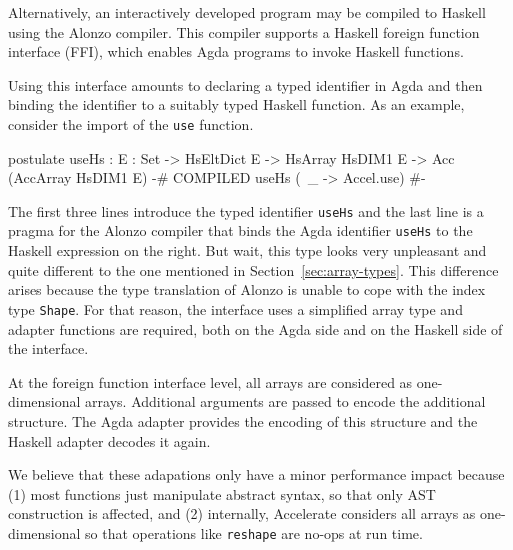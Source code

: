 \documentclass{llncs}
\begin{document}
Alternatively, an interactively developed program may be compiled to
Haskell using the Alonzo compiler. This compiler supports a Haskell
foreign function interface (FFI), which enables Agda programs to invoke
Haskell functions. 

Using this interface amounts to declaring a typed identifier in Agda
and then binding the identifier to a suitably typed Haskell
function. As an example, consider the import of the \texttt{use}
function.
\begin{code}
postulate 
  useHs : {E : Set}
      -> HsEltDict E -> HsArray HsDIM1 E -> Acc (AccArray HsDIM1 E)
  {-# COMPILED useHs       (\ _ -> Accel.use) #-}
\end{code}
The first three lines introduce the typed identifier \texttt{useHs}
and the last line is a pragma for the Alonzo compiler that binds the
Agda identifier \texttt{useHs} to the Haskell expression on the right.
But wait, this type looks very unpleasant and quite different to the
one mentioned in Section~\ref{sec:array-types}. This difference arises
because the type translation of Alonzo is unable to cope with the
index type \texttt{Shape}. For that reason, the interface uses a
simplified array type and adapter functions are required, both on the
Agda side and on the Haskell side of the interface.

At the foreign function interface level, all arrays are considered as
one-dimensional arrays. Additional arguments are passed to encode the
additional structure. The Agda adapter provides the encoding of this
structure and the Haskell adapter decodes it again. 

We believe that these adapations only have a minor performance impact
because (1) most functions just manipulate abstract syntax, so that
only AST construction is affected, and (2) internally, Accelerate
considers all arrays as one-dimensional so that operations like
\texttt{reshape} are no-ops at run time.
\end{document}
